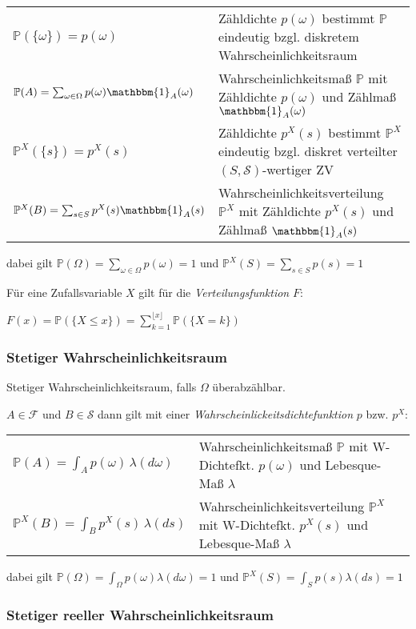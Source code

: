 \documentclass{article}
\begin{document}
\begin{tabular}{ll}
$\mathbb{P}(\{\omega\}) = p(\omega)$ & Zähldichte $p(\omega)$ bestimmt $\mathbb{P}$ eindeutig bzgl. diskretem Wahrscheinlichkeitsraum\\
$\mathbb{P}(A) = \sum_{\omega \in \Omega} p(\omega) \mathbbm{1}_A(\omega)$ & Wahrscheinlichkeitsmaß $\mathbb{P}$ mit Zähldichte $p(\omega)$ und Zählmaß $\mathbbm{1}_A(\omega)$ \\
$\mathbb{P}^X(\{s\}) = p^X(s)$ & Zähldichte $p^X(s)$ bestimmt $\mathbb{P}^X$ eindeutig bzgl. diskret verteilter $(S,\mathcal{S})$-wertiger ZV\\
$\mathbb{P}^X(B) = \sum_{s \in S} p^X(s) \mathbbm{1}_A(s)$ & Wahrscheinlichkeitsverteilung $\mathbb{P}^X$ mit Zähldichte $p^X(s)$ und Zählmaß $\mathbbm{1}_A(s)$ \\
\end{tabular}

dabei gilt $\mathbb{P}(\Omega) = \sum_{\omega \in \Omega} p(\omega) = 1$ und $\mathbb{P}^X(S) = \sum_{s \in S} p(s) = 1$

Für eine Zufallsvariable $X$ gilt für die \emph{Verteilungsfunktion} $F$:

$F(x) = \mathbb{P}(\{ X \le x \}) = \sum_{k=1}^{\lfloor x \rfloor} \mathbb{P}(\{ X = k \})$

\subsubsection*{Stetiger Wahrscheinlichkeitsraum}

Stetiger Wahrscheinlichkeitsraum, falls $\Omega$ überabzählbar.

$A \in \mathcal{F}$ und $B \in \mathcal{S}$ dann gilt mit einer \emph{Wahrscheinlickeitsdichtefunktion} $p$ bzw. $p^X$:

\begin{tabular}{ll}
$\mathbb{P}(A) = \int_A p(\omega)\, \lambda(d\omega)$ & Wahrscheinlichkeitsmaß $\mathbb{P}$ mit W-Dichtefkt. $p(\omega)$ und Lebesque-Maß $\lambda$ \\
$\mathbb{P}^X(B) = \int_{B} p^X(s)\, \lambda(ds)$ & Wahrscheinlichkeitsverteilung $\mathbb{P}^X$ mit W-Dichtefkt. $p^X(s)$ und Lebesque-Maß $\lambda$ \\
\end{tabular}

dabei gilt $\mathbb{P}(\Omega) = \int_{\Omega} p(\omega) \lambda(d\omega) = 1$ und $\mathbb{P}^X(S) = \int_{S} p(s) \lambda(ds) = 1$

\subsubsection*{Stetiger reeller Wahrscheinlichkeitsraum}
\end{document}
